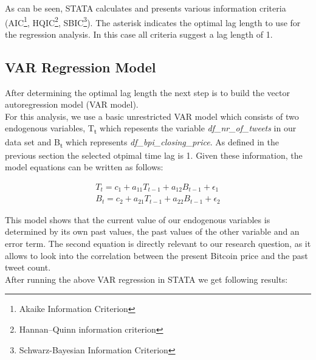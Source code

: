 \documentclass[a4paper,american,12pt]{article}
\begin{document}
\begin{spacing}{1.2}
As can be seen, STATA calculates and presents various information criteria (AIC\footnote{Akaike Information Criterion}, HQIC\footnote{Hannan–Quinn information criterion}, SBIC\footnote{Schwarz-Bayesian Information Criterion}). The asterisk indicates the optimal lag length to use for the regression analysis. In this case all criteria suggest a lag length of 1.
		
\subsection{VAR Regression Model}
After determining the optimal lag length the next step is to build the vector autoregression model (VAR model).\\
For this analysis, we use a basic unrestricted VAR model which consists of two endogenous variables, T\textsubscript t which repesents the variable {\itshape df\_nr\_of\_tweets} in our data set and B\textsubscript t which represents {\itshape df\_bpi\_closing\_price}. As defined in the previous section the selected otpimal time lag is 1. Given these information, the model equations can be written as follows:

\begin{align}
T_t = c_1 + a_{11}T_{t-1} + a_{12}B_{t-1} + \epsilon_1 \\
B_t = c_2 + a_{21}T_{t-1} + a_{22}B_{t-1} + \epsilon_2
\end{align}

This model shows that the current value of our endogenous variables is determined by its own past values, the past values of the other variable and an error term. The second equation is directly relevant to our research question, as it allows to look into the correlation between the present Bitcoin price and the past tweet count.\\

After running the above VAR regression in STATA we get following results:
	

\end{spacing}
\end{document}

